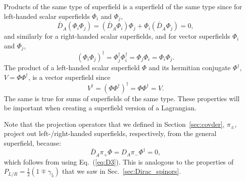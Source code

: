 \documentclass[notes.tex]{subfiles}
\begin{document}
Products of the same type of superfield is a superfield of the same type since for left-handed scalar superfields $\Phi_i$ and $\Phi_j$,
\[ \bar{D}_{\dot{A}}(\Phi_i\Phi_j) = (\bar{D}_{\dot{A}}\Phi_i)\Phi_j +\Phi_i( \bar{D}_{\dot{A}}\Phi_j)=0,\]
and similarly for a right-handed scalar superfields, and for vector superfields $\Phi_i$ and $\Phi_j$,
\[(\Phi_i\Phi_j)^\dagger=\Phi_j^\dagger \Phi_i^\dagger=\Phi_j \Phi_i= \Phi_i\Phi_j.\]
The product of a left-handed scalar superfield $\Phi$ and its hermitian conjugate $\Phi^\dagger$, $V=\Phi \Phi^\dagger$, is a vector superfield since
\[V^\dagger=(\Phi \Phi^\dagger)^\dagger=\Phi \Phi^\dagger=V.\]
The same is true for sums of superfields of the same type. These properties will be important when creating a superfield version of a Lagrangian.

Note that the projection operators that we defined in Section~\ref{sec:covder}, $\pi_\pm$, project out left-/right-handed superfields, respectively,  from the general superfield, because:
\[\bar{D}_{\dot{A}}\pi_+\Phi = D_A \pi_- \Phi^\dagger = 0, \]
which follows from using Eq.~(\ref{eq:D3}). This is analogous to the properties of $P_{L/R} = \frac{1}{2}(1\mp \gamma_5)$ that we saw in Sec.~\ref{sec:Dirac_spinors}.

\end{document}
